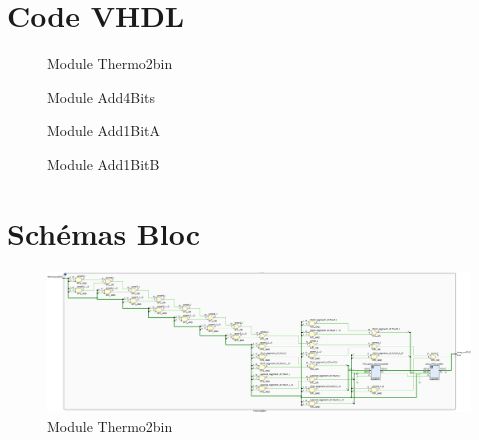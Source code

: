 \newpage
\appendix
\section{Code VHDL}

\begin{figure}[H]
	\tiny
	\centering
	\begin{varwidth}{\linewidth}
		
	\end{varwidth}
	\caption{Module Thermo2bin}
\end{figure}

\begin{figure}[H]
	\tiny
	\centering
	\begin{varwidth}{\linewidth}
		
	\end{varwidth}
	\caption{Module Add4Bits}
\end{figure}

\begin{figure}[H]
	\tiny
	\centering
	\begin{varwidth}{\linewidth}
		
	\end{varwidth}
	\caption{Module Add1BitA}
\end{figure}

\begin{figure}[H]
	\tiny
	\centering
	\begin{varwidth}{\linewidth}
		
	\end{varwidth}
	\caption{Module Add1BitB}
\end{figure}

\section{Schémas Bloc}



\begin{figure}[H]
	\centering
	\includegraphics[width=\textwidth]{assets/img/schematic-thermo2bin.png}
	\caption{Module Thermo2bin}
\end{figure}

